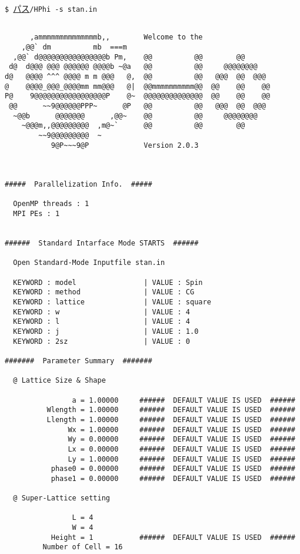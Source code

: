 \vspace{1cm}\hspace{-0.7cm}
\verb|$ |\underline{パス}\verb|/HPhi -s stan.in|
\small
\begin{verbatim}

      ,ammmmmmmmmmmmmmb,,        Welcome to the
    ,@@` dm          mb  ===m
  ,@@` d@@@@@@@@@@@@@@@@b Pm,    @@          @@        @@
 d@  d@@@ @@@ @@@@@@ @@@@b ~@a   @@          @@     @@@@@@@@
d@   @@@@ ^^^ @@@@ m m @@@   @,  @@          @@   @@@  @@  @@@
@    @@@@_@@@_@@@@mm mm@@@   @|  @@mmmmmmmmmm@@  @@    @@    @@
P@    9@@@@@@@@@@@@@@@@@P    @~  @@@@@@@@@@@@@@  @@    @@    @@
 @@      ~~9@@@@@@PPP~      @P   @@          @@   @@@  @@  @@@
  ~@@b      @@@@@@@      ,@@~    @@          @@     @@@@@@@@
    ~@@@m,,@@@@@@@@@  ,m@~`      @@          @@        @@
        ~~9@@@@@@@@@  ~
           9@P~~~9@P             Version 2.0.3



#####  Parallelization Info.  #####

  OpenMP threads : 1
  MPI PEs : 1


######  Standard Intarface Mode STARTS  ######

  Open Standard-Mode Inputfile stan.in

  KEYWORD : model                | VALUE : Spin
  KEYWORD : method               | VALUE : CG
  KEYWORD : lattice              | VALUE : square
  KEYWORD : w                    | VALUE : 4
  KEYWORD : l                    | VALUE : 4
  KEYWORD : j                    | VALUE : 1.0
  KEYWORD : 2sz                  | VALUE : 0

#######  Parameter Summary  #######

  @ Lattice Size & Shape

                a = 1.00000     ######  DEFAULT VALUE IS USED  ######
          Wlength = 1.00000     ######  DEFAULT VALUE IS USED  ######
          Llength = 1.00000     ######  DEFAULT VALUE IS USED  ######
               Wx = 1.00000     ######  DEFAULT VALUE IS USED  ######
               Wy = 0.00000     ######  DEFAULT VALUE IS USED  ######
               Lx = 0.00000     ######  DEFAULT VALUE IS USED  ######
               Ly = 1.00000     ######  DEFAULT VALUE IS USED  ######
           phase0 = 0.00000     ######  DEFAULT VALUE IS USED  ######
           phase1 = 0.00000     ######  DEFAULT VALUE IS USED  ######

  @ Super-Lattice setting

                L = 4
                W = 4
           Height = 1           ######  DEFAULT VALUE IS USED  ######
         Number of Cell = 16


\end{verbatim}

